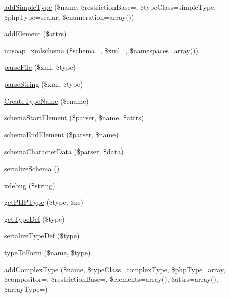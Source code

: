 \begin{DoxyCompactItemize}
\item 
\hyperlink{classnusoap__xmlschema_a31228a55d8cdb602e32f481406e7455c}{add\+Simple\+Type} (\$name, \$restriction\+Base=\textquotesingle{}\textquotesingle{}, \$type\+Class=\textquotesingle{}simple\+Type\textquotesingle{}, \$php\+Type=\textquotesingle{}scalar\textquotesingle{}, \$enumeration=array())
\item 
\hyperlink{classnusoap__xmlschema_a7341d393047f63fdcb50dd44d2eff448}{add\+Element} (\$attrs)
\item 
\hyperlink{classnusoap__xmlschema_ae570ce5817d4c4488317ff0fa63d4a8e}{nusoap\+\_\+xmlschema} (\$schema=\textquotesingle{}\textquotesingle{}, \$xml=\textquotesingle{}\textquotesingle{}, \$namespaces=array())
\item 
\hyperlink{classnusoap__xmlschema_a4495d09bfd675f7fbd6b6918ecc84795}{parse\+File} (\$xml, \$type)
\item 
\hyperlink{classnusoap__xmlschema_ad3efb7e0aa9ceb47b09783473a7deae6}{parse\+String} (\$xml, \$type)
\item 
\hyperlink{classnusoap__xmlschema_a8eeebc3af32c4ddcc96b891dffeb5b32}{Create\+Type\+Name} (\$ename)
\item 
\hyperlink{classnusoap__xmlschema_abe761abcfe8369fb87739c8d776eead0}{schema\+Start\+Element} (\$parser, \$name, \$attrs)
\item 
\hyperlink{classnusoap__xmlschema_a8e536da75a8a0d3f44d6d275ff4229c9}{schema\+End\+Element} (\$parser, \$name)
\item 
\hyperlink{classnusoap__xmlschema_af69d1aa4838f91acf8066b8f33e2a016}{schema\+Character\+Data} (\$parser, \$data)
\item 
\hyperlink{classnusoap__xmlschema_ae1f5bc3d8e49c4592e8d00d7890f3e47}{serialize\+Schema} ()
\item 
\hyperlink{classnusoap__xmlschema_af7f8d34ac5331189b07d83cb9fa5f4e9}{xdebug} (\$string)
\item 
\hyperlink{classnusoap__xmlschema_aebfbaab31cdb69fabf5a7c5f2bbd605b}{get\+P\+H\+P\+Type} (\$type, \$ns)
\item 
\hyperlink{classnusoap__xmlschema_a4d3354e230b2cbe9cbf168665ef0a79d}{get\+Type\+Def} (\$type)
\item 
\hyperlink{classnusoap__xmlschema_a6ede91c15c6a31e99181cd698f06365c}{serialize\+Type\+Def} (\$type)
\item 
\hyperlink{classnusoap__xmlschema_ad829fa57be032e351ebf74b60918c8ba}{type\+To\+Form} (\$name, \$type)
\item 
\hyperlink{classnusoap__xmlschema_a8086789ccd44f879ab77ba98dfa08aa2}{add\+Complex\+Type} (\$name, \$type\+Class=\textquotesingle{}complex\+Type\textquotesingle{}, \$php\+Type=\textquotesingle{}array\textquotesingle{}, \$compositor=\textquotesingle{}\textquotesingle{}, \$restriction\+Base=\textquotesingle{}\textquotesingle{}, \$elements=array(), \$attrs=array(), \$array\+Type=\textquotesingle{}\textquotesingle{})

\end{DoxyCompactItemize}
